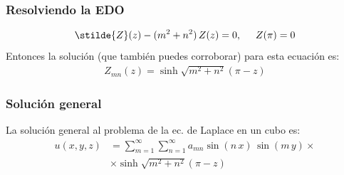 \begin{frame}
\frametitle{Resolviendo la EDO}
\begin{align*}
\stilde{Z} (z) - (m^{2} + n^{2}) \, Z(z) = 0, \hspace{0.5cm} Z(\pi) = 0
\end{align*}
\pause
Entonces la solución (que también puedes corroborar) para esta ecuación es:
\begin{align*}
Z_{mn} (z) = \sinh \sqrt{m^{2} + n^{2}} (\pi - z)
\end{align*}
\end{frame}
\begin{frame}
\frametitle{Solución general}
La solución general al problema de la ec. de Laplace en un cubo es:
\begin{align*}
u(x, y, z) &= \sum_{m=1}^{\infty} \sum_{n=1}^{\infty} a_{mn} \sin (n \, x) \, \sin (m \, y) \times \\[0.5em]
&\times \sinh \sqrt{m^{2} + n^{2}}(\pi - z)
\end{align*}
\end{frame}
